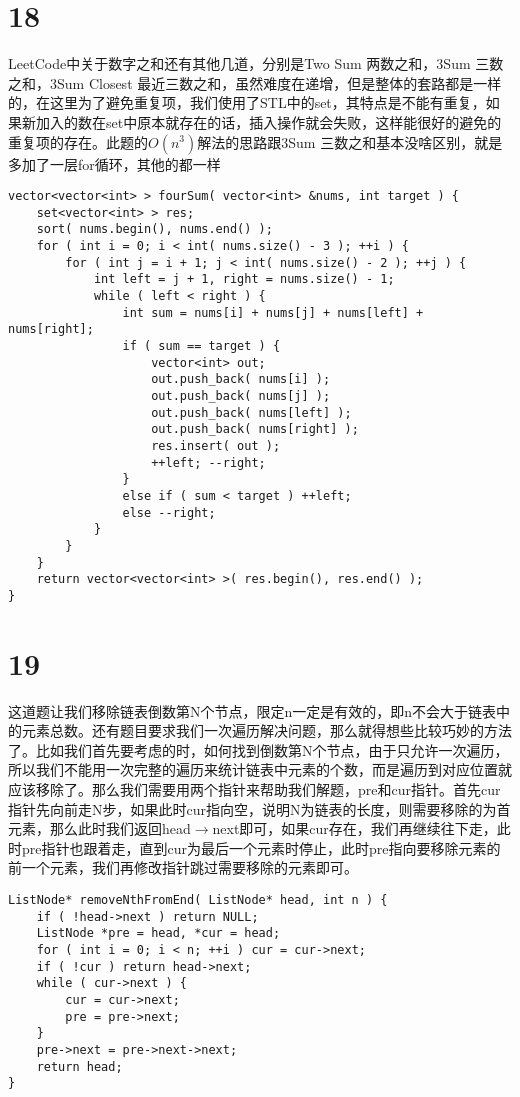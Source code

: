 \documentclass[12pt,a4paper]{article}
\begin{document}
\section{18}
\begin{CJK}{UTF8}{gbsn}
LeetCode中关于数字之和还有其他几道，分别是Two Sum 两数之和，3Sum 三数之和，3Sum Closest 最近三数之和，虽然难度在递增，但是整体的套路都是一样的，在这里为了避免重复项，我们使用了STL中的set，其特点是不能有重复，如果新加入的数在set中原本就存在的话，插入操作就会失败，这样能很好的避免的重复项的存在。此题的$O(n^3)$解法的思路跟3Sum 三数之和基本没啥区别，就是多加了一层for循环，其他的都一样
\end{CJK}
\begin{lstlisting}
vector<vector<int> > fourSum( vector<int> &nums, int target ) {
	set<vector<int> > res;
	sort( nums.begin(), nums.end() );
	for ( int i = 0; i < int( nums.size() - 3 ); ++i ) {
		for ( int j = i + 1; j < int( nums.size() - 2 ); ++j ) {
			int left = j + 1, right = nums.size() - 1;
			while ( left < right ) {
				int sum = nums[i] + nums[j] + nums[left] + nums[right];
				if ( sum == target ) {
					vector<int> out;
					out.push_back( nums[i] );
					out.push_back( nums[j] );
					out.push_back( nums[left] );
					out.push_back( nums[right] );
					res.insert( out );
					++left; --right;
				}
				else if ( sum < target ) ++left;
				else --right;
			}
		}
	}
	return vector<vector<int> >( res.begin(), res.end() );
}
\end{lstlisting}

\section{19}
\begin{CJK}{UTF8}{gbsn}
这道题让我们移除链表倒数第N个节点，限定n一定是有效的，即n不会大于链表中的元素总数。还有题目要求我们一次遍历解决问题，那么就得想些比较巧妙的方法了。比如我们首先要考虑的时，如何找到倒数第N个节点，由于只允许一次遍历，所以我们不能用一次完整的遍历来统计链表中元素的个数，而是遍历到对应位置就应该移除了。那么我们需要用两个指针来帮助我们解题，pre和cur指针。首先cur指针先向前走N步，如果此时cur指向空，说明N为链表的长度，则需要移除的为首元素，那么此时我们返回head$\rightarrow$next即可，如果cur存在，我们再继续往下走，此时pre指针也跟着走，直到cur为最后一个元素时停止，此时pre指向要移除元素的前一个元素，我们再修改指针跳过需要移除的元素即可。
\end{CJK}
\begin{lstlisting}
ListNode* removeNthFromEnd( ListNode* head, int n ) {
	if ( !head->next ) return NULL;
	ListNode *pre = head, *cur = head;
	for ( int i = 0; i < n; ++i ) cur = cur->next;
	if ( !cur ) return head->next;
	while ( cur->next ) {
		cur = cur->next;
		pre = pre->next;
	}
	pre->next = pre->next->next;
	return head;
}
\end{lstlisting}
\end{document}
